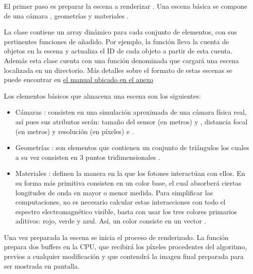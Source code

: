 El primer paso es preparar la escena a renderizar . Una escena básica se compone de una cámara , geometrías  y materiales .

La clase  contiene un array dinámico para cada conjunto de elementos, con sus pertinentes funciones de añadido. Por ejemplo, la función  lleva la cuenta de objetos en la escena y actualiza el ID de cada objeto a partir de esta cuenta. Además esta clase cuenta con una función denominada  que cargará una escena localizada en un directorio. Más detalles sobre el formato de estas escenas se puede encontrar en \hyperref[sceneformat]{el manual ubicado en el anexo}

Los elementos básicos que almacena una escena son los siguientes:

\begin{itemize}

\item Cámaras : consisten en una simulación aproximada de una cámara física real, así pues sus atributos serán: tamaño del sensor (en metros)  y , distancia focal (en metros)  y resolución (en píxeles)  e . 

\item Geometrías : son elementos que contienen un conjunto de triángulos  los cuales a su vez consisten en 3 puntos tridimensionales .

\item Materiales : definen la manera en la que los fotones interactúan con ellos. En su forma más primitiva consisten en un color base, el cual absorberá ciertas longitudes de onda en mayor o menor medida. Para simplificar las computaciones, no es necesario calcular estas interacciones con todo el espectro electromagnético visible, basta con usar los tres colores primarios aditivos: rojo, verde y azul. Así, un color consiste en un vector .

\end{itemize}

Una vez preparada la escena se inicia el proceso de renderizado. La función  prepara dos buffers en la CPU,  que recibirá los píxeles procedentes del algoritmo, previos a cualquier modificación y  que contendrá la imagen final preparada para ser mostrada en pantalla. 


